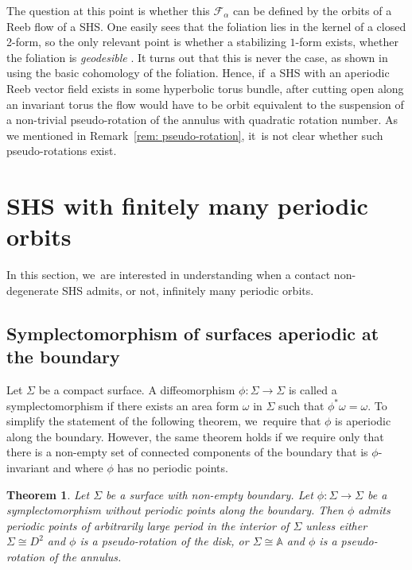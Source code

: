 \documentclass[JEP,XML,SOM,Unicode,NoEqCountersInSection,NoFloatCountersInSection,published]{cedram}
\newtheorem{theorem}{Theorem}[section]
\theoremstyle{definition}
\begin{document}
The question at this point is whether this $\mathcal{F}_\alpha$ can be defined by the orbits of a Reeb flow of a SHS. One easily sees that the foliation lies in the kernel of a closed 2-form, so the only relevant point is whether a stabilizing $1$-form exists, \ie whether the foliation is \emph{geodesible} \cite{Sul}. It turns out that this is never the case, as shown in \cite[Rem.\,2.1]{Ac} using the basic cohomology of the foliation. Hence, if~a SHS with an aperiodic Reeb vector field exists in some hyperbolic torus bundle, after cutting open along an invariant torus the flow would have to be orbit equivalent to the suspension of a non-trivial pseudo-rotation of the annulus with quadratic rotation number. As we mentioned in Remark~\ref{rem: pseudo-rotation}, it~is not clear whether such pseudo-rotations exist.

\section{SHS with finitely many periodic orbits}\label{s:finite}

In this section, we~are interested in understanding when a contact non-degenerate SHS admits, or not, infinitely many periodic orbits.

\subsection{Symplectomorphism of surfaces aperiodic at the boundary}

Let $\Sigma$ be a compact surface. A diffeomorphism $\phi:\Sigma \to \Sigma$ is called a symplectomorphism if there exists an area form $\omega$ in $\Sigma$ such that $\phi^*\omega=\omega$. To simplify the statement of the following theorem, we~require that $\phi$ is aperiodic along the boundary. However, the same theorem holds if we require only that there is a non-empty set of connected components of the boundary that is $\phi$-invariant and where $\phi$ has no periodic points.

\begin{theorem} \label{thm:surfirra}
Let $\Sigma$ be a surface with non-empty boundary. Let $\phi:\Sigma \to \Sigma$ be a symplectomorphism without periodic points along the boundary. Then $\phi$ admits periodic points of arbitrarily large period in the interior of $\Sigma$ unless either $\Sigma\cong D^2$ and $\phi$ is a pseudo-rotation of the disk, or $\Sigma \cong \mathbb{A}$ and $\phi$ is a pseudo-rotation of the annulus.
\end{theorem}
\end{document}
